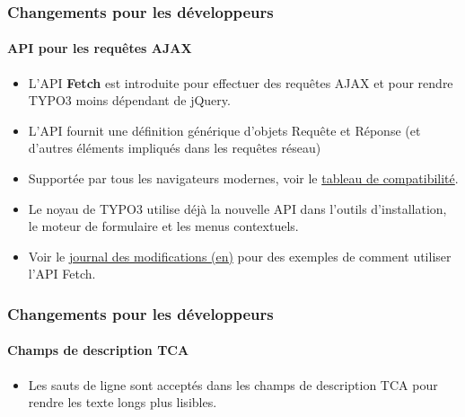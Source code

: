
\begin{frame}[fragile]
	\frametitle{Changements pour les développeurs}
	\framesubtitle{API pour les requêtes AJAX}

	\lstset{basicstyle=\tiny\ttfamily}

	\begin{itemize}
		\item L'API \textbf{Fetch} est introduite pour effectuer des requêtes AJAX
			et pour rendre TYPO3 moins dépendant de jQuery.
		\item L'API fournit une définition générique d'objets Requête et Réponse
			(et d'autres éléments impliqués dans les requêtes réseau)
		\item Supportée par tous les navigateurs modernes, voir le
			\href{https://developer.mozilla.org/en-US/docs/Web/API/Fetch_API}{tableau de compatibilité}.
		\item Le noyau de TYPO3 utilise déjà la nouvelle API dans l'outils d'installation, le moteur de
			formulaire et les menus contextuels.
		\item Voir le
			\href{https://docs.typo3.org/c/typo3/cms-core/master/en-us/Changelog/10.3/Feature-89738-ApiForAjaxRequests.html}{journal des modifications (en)}
			pour des exemples de comment utiliser l'API Fetch.

	\end{itemize}

\end{frame}


\begin{frame}[fragile]
	\frametitle{Changements pour les développeurs}
	\framesubtitle{Champs de description TCA}

	\begin{itemize}
		\item Les sauts de ligne sont acceptés dans les champs de description TCA
			pour rendre les texte longs plus lisibles.
	\end{itemize}

\end{frame}


